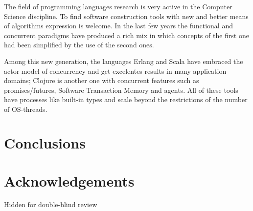 \documentclass[runningheads,a4paper]{llncs}
\begin{document}
The field of programming languages research is very active in the
Computer Science discipline. To find software construction tools with
new and better means of algorithms expression is welcome. In the last
few years the functional and concurrent paradigms have produced a rich
mix in which concepts of the first one had been simplified by the use
of the second ones. 

Among this new generation, the languages Erlang and Scala have
embraced the actor model of concurrency and get excelentes results in
many application domains; Clojure is another one with concurrent
features such as promises/futures, Software Transaction Memory and
agents. All of these tools have processes like built-in types and
scale beyond the restrictions of the number of OS-threads.

\section{Conclusions}
\label{sec:conclusions}

\section*{Acknowledgements}

Hidden for double-blind review



\end{document}
